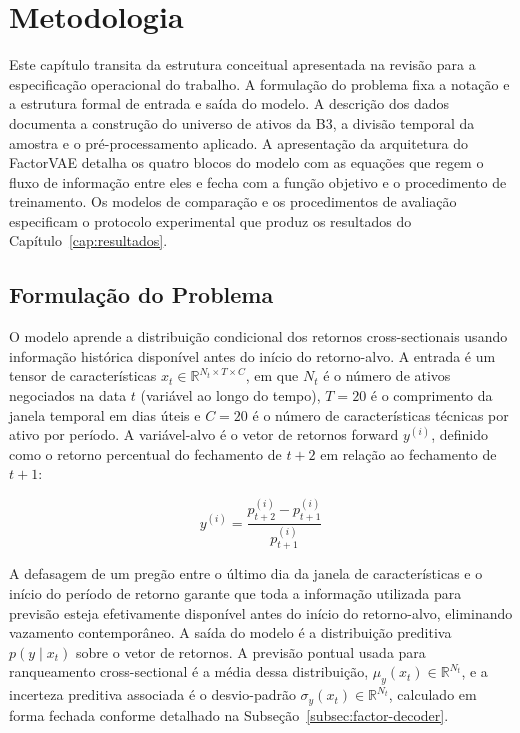 \chapter{Metodologia}
\label{cap:metodologia}

Este capítulo transita da estrutura conceitual apresentada na revisão para a
especificação operacional do trabalho. A formulação do problema fixa a notação e a
estrutura formal de entrada e saída do modelo. A descrição dos dados documenta a
construção do universo de ativos da B3, a divisão temporal da amostra e o
pré-processamento aplicado. A apresentação da arquitetura do FactorVAE detalha os
quatro blocos do modelo com as equações que regem o fluxo de informação entre eles e
fecha com a função objetivo e o procedimento de treinamento. Os modelos de comparação
e os procedimentos de avaliação especificam o protocolo experimental que produz os
resultados do Capítulo~\ref{cap:resultados}.


\section{Formulação do Problema}
\label{sec:formulacao}

O modelo aprende a distribuição condicional dos retornos cross-sectionais usando
informação histórica disponível antes do início do retorno-alvo. A entrada é um tensor
de características $x_t \in \mathbb{R}^{N_t \times T \times C}$, em que $N_t$ é o
número de ativos negociados na data $t$ (variável ao longo do tempo), $T = 20$ é o
comprimento da janela temporal em dias úteis e $C = 20$ é o número de características
técnicas por ativo por período. A variável-alvo é o vetor de retornos forward
$y^{(i)}$, definido como o retorno percentual do fechamento de $t{+}2$ em relação ao
fechamento de $t{+}1$:

\begin{equation}
    y^{(i)} = \frac{p_{t+2}^{(i)} - p_{t+1}^{(i)}}{p_{t+1}^{(i)}}
    \label{eq:retorno-alvo}
\end{equation}

A defasagem de um pregão entre o último dia da janela de características e o início do
período de retorno garante que toda a informação utilizada para previsão esteja
efetivamente disponível antes do início do retorno-alvo, eliminando vazamento
contemporâneo. A saída do modelo é a distribuição preditiva $p(y \mid x_t)$ sobre o
vetor de retornos. A previsão pontual usada para ranqueamento cross-sectional é a
média dessa distribuição, $\mu_y(x_t) \in \mathbb{R}^{N_t}$, e a incerteza preditiva
associada é o desvio-padrão $\sigma_y(x_t) \in \mathbb{R}^{N_t}$, calculado em forma
fechada conforme detalhado na Subseção~\ref{subsec:factor-decoder}.


